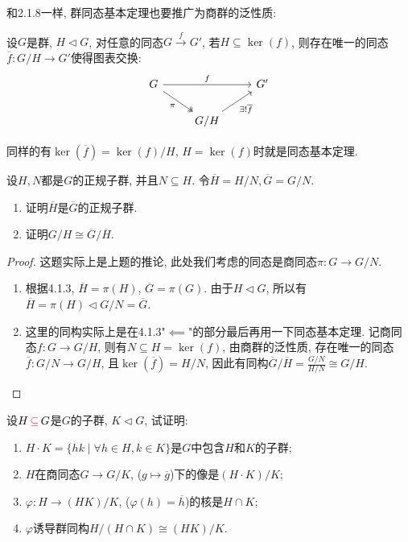 \documentclass{../solutions-cn}
\begin{document}
\begin{remark}
    和2.1.8一样, 群同态基本定理也要推广为商群的泛性质:
    \begin{thmstar}
        设$G$是群, $H \lhd G$, 对任意的同态$G \stackrel{f}{\to} G'$, 若$H \subseteq \ker(f)$, 则存在唯一的同态$\overline{f}:G/H \to G'$使得图表交换:
        \[
            \begin{tikzcd}
                G \arrow[rr, "f"] \arrow[rd, "\pi"', two heads] &                                 & G' \\
                                                                & G/H \arrow[ru, "\exists!\overline{f}"'] &   
                \end{tikzcd}
        \]
    \end{thmstar}
    同样的有$\ker(\overline{f}) = \ker(f)/H$, $H = \ker(f)$时就是同态基本定理.
\end{remark}

\begin{exercise}[习题4.1.4]
    设$H, N$都是$G$的正规子群, 并且$N \subseteq H$. 令$\overline{H} = H/N, \overline{G} = G/N$.
    \begin{enumerate}[(1)]
        \item 证明$\overline{H}$是$\overline{G}$的正规子群.
        \item 证明$G/H \cong \overline{G}/\overline{H}$.
    \end{enumerate}
\end{exercise}

\begin{proof}
    这题实际上是上题的推论, 此处我们考虑的同态是商同态$\pi:G \to G/N$.
    \begin{enumerate}[(1)]
        \item 根据4.1.3, $\overline{H} = \pi(H)$, $\overline{G} = \pi(G)$. 由于$H \lhd G$, 所以有$\overline{H} = \pi(H) \lhd G/N = \overline{G}$.
        \item 这里的同构实际上是在4.1.3"$\impliedby$"的部分最后再用一下同态基本定理. 记商同态$f:G \to G/H$, 则有$N \subseteq H = \ker(f)$, 由商群的泛性质, 存在唯一的同态$\overline{f}:G/N \to G/H$, 且$\ker(\overline{f}) = H/N$, 因此有同构$\overline{G}/\overline{H} = \frac{G/N}{H/N} \cong G/H$.
    \end{enumerate}
\end{proof}

\begin{exercise}[习题4.1.5]
    设$H \,\textcolor{red}{\subseteq}\, G$是$G$的子群, $K \lhd G$, 试证明: 
    \begin{enumerate}[(1)]
        \item $H \cdot K = \{hk \mid \forall h \in H, k \in K\}$是$G$中包含$H$和$K$的子群;
        \item $H$在商同态$G \to G/K$, ($g \mapsto \overline{g}$)下的像是$(H \cdot K)/K$;
        \item $\varphi:H \to (HK)/K$, ($\varphi(h) = \overline{h}$)的核是$H \cap K$;
        \item $\varphi$诱导群同构$H/(H \cap K) \cong (HK)/K$.
    \end{enumerate}
\end{exercise}
\end{document}

